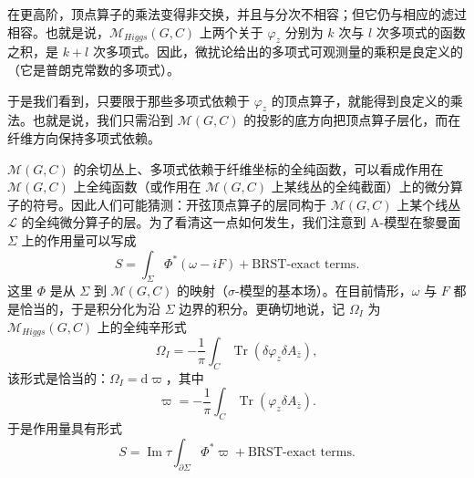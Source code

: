\documentclass[11pt,a4paper,UTF8]{ctexart}
\begin{document}
在更高阶，顶点算子的乘法变得非交换，并且与分次不相容；但它仍与相应的滤过相容。也就是说，$\mathcal{M}_{Higgs}(G,C)$ 上两个关于 $\varphi_{z}$ 分别为 $k$ 次与 $l$ 次多项式的函数之积，是 $k+l$ 次多项式。因此，微扰论给出的多项式可观测量的乘积是良定义的（它是普朗克常数的多项式）。


于是我们看到，只要限于那些多项式依赖于 $\varphi_{z}$ 的顶点算子，就能得到良定义的乘法。也就是说，我们只需沿到 $\mathcal{M}(G,C)$ 的投影的底方向把顶点算子层化，而在纤维方向保持多项式依赖。

$\mathcal{M}(G,C)$ 的余切丛上、多项式依赖于纤维坐标的全纯函数，可以看成作用在 $\mathcal{M}(G,C)$ 上全纯函数（或作用在 $\mathcal{M}(G,C)$ 上某线丛的全纯截面）上的微分算子的符号。因此人们可能猜测：开弦顶点算子的层同构于 $\mathcal{M}(G,C)$ 上某个线丛 $\mathcal{L}$ 的全纯微分算子的层。为了看清这一点如何发生，我们注意到 A-模型在黎曼面 $\Sigma$ 上的作用量可以写成
\[
    S=\int_{\Sigma}\Phi^{*}(\omega-iF)+\text{BRST-exact terms}.
\]
这里 $\Phi$ 是从 $\Sigma$ 到 $\mathcal{M}(G,C)$ 的映射（$\sigma$-模型的基本场）。在目前情形，$\omega$ 与 $F$ 都是恰当的，于是积分化为沿 $\Sigma$ 边界的积分。更确切地说，记 $\Omega_{I}$ 为 $\mathcal{M}_{Higgs}(G,C)$ 上的全纯辛形式
\[
    \Omega_{I}=-\frac{1}{\pi}\int_{C}\operatorname{Tr}\left(\delta\varphi_{z}\delta A_{\bar z}\right),
\]
该形式是恰当的：$\Omega_{I}=\mathrm{d}\varpi$，其中
\[
    \varpi=-\frac{1}{\pi}\int_{C}\operatorname{Tr}\left(\varphi_{z}\delta A_{\bar z}\right).
\]
于是作用量具有形式
\[
    S=\operatorname{Im}\tau\int_{\partial\Sigma}\Phi^{*}\varpi+\text{BRST-exact terms}.
\]


\end{document}
